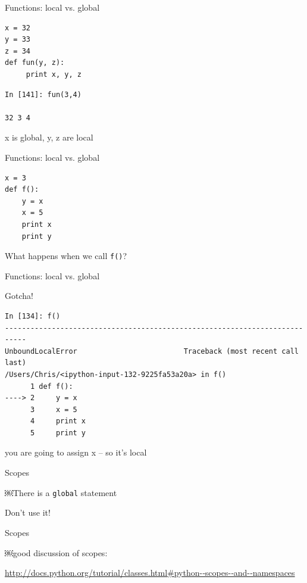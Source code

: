\documentclass{beamer}
\begin{document}
\begin{frame}[fragile]{Functions: local vs. global}

\begin{verbatim}
x = 32
y = 33
z = 34
def fun(y, z):
     print x, y, z
\end{verbatim}
\begin{verbatim}
In [141]: fun(3,4)

32 3 4
\end{verbatim}
{\Large x is global, y, z are local}

\end{frame}

\begin{frame}[fragile]{Functions: local vs. global}

\begin{verbatim}
x = 3
def f():
    y = x
    x = 5
    print x
    print y
\end{verbatim}
  
{\Large What happens when we call \verb+f()+?}

\end{frame}

\begin{frame}[fragile]{Functions: local vs. global}

{\Large Gotcha!}

\begin{verbatim}
In [134]: f()
---------------------------------------------------------------------------
UnboundLocalError                         Traceback (most recent call last)
/Users/Chris/<ipython-input-132-9225fa53a20a> in f()
      1 def f():
----> 2     y = x
      3     x = 5
      4     print x
      5     print y
\end{verbatim}
  
{\Large you are going to assign x -- so it's local}

\end{frame}

\begin{frame}[fragile]{Scopes}

\vspace{0.5in}
{\Large￼There is a \verb+global+ statement}

\pause
\vspace{0.5in}
{\LARGE Don't use it!}

\end{frame}

\begin{frame}[fragile]{Scopes}

\vspace{0.5in}
{\Large￼good discussion of scopes:}

\vspace{0.5in}
\url{http://docs.python.org/tutorial/classes.html#python-­‐scopes-­‐and-­‐namespaces}

\end{frame}
\end{document}
